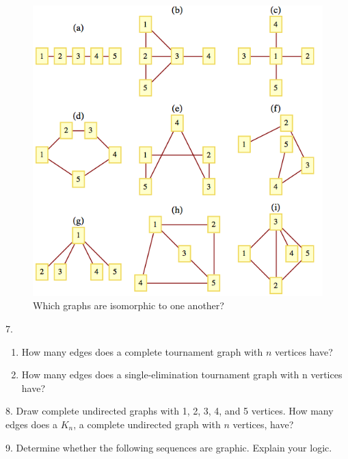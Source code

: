 \documentclass[10pt,]{book}
\theoremstyle{plain}
\theoremstyle{definition}
\theoremstyle{definition}
\theoremstyle{definition}
\theoremstyle{definition}
\theoremstyle{definition}
\numberwithin{equation}{section}
\begin{document}
\begin{exercisegroup}
\begin{figure}
\includegraphics[width=1\linewidth]{images/fig-exercise-9-1-6.png}
\caption{Which graphs are isomorphic to one another?
                \label{fig-exercise-9-1-6}}
\end{figure}
\par\smallskip
\item[7.]\hypertarget{exercise-7}{}\leavevmode%
\begin{enumerate}[label=\alph*]
\item\hypertarget{li-13}{}How many edges does a complete tournament graph with \(n\) vertices have?%
\item\hypertarget{li-14}{}How many edges does a single-elimination tournament graph with n vertices have?%
\end{enumerate}
%
\par\smallskip
\item[8.]\hypertarget{exercise-8}{}Draw complete undirected graphs with 1, 2, 3, 4, and 5 vertices. How many edges does a \(K_n\), a complete undirected graph with \(n\) vertices, have?%
\par\smallskip
\item[9.]\hypertarget{exercise-9}{} Determine whether the following sequences are graphic. Explain your logic.%
\par
\leavevmode%
\begin{enumerate}[label=\alph*]

\end{enumerate}
\end{exercisegroup}
\end{document}
